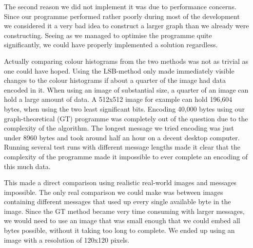 The second reason we did not implement it was due to performance concerns.
Since our programme performed rather poorly during most of the development we considered it a very bad idea to construct a larger graph than we already were constructing.
Seeing as we managed to optimise the programme quite significantly, we could have properly implemented a solution regardless.

Actually comparing colour histograms from the two methods was not as trivial as one could have hoped.
Using the LSB-method only made immediately visible changes to the colour histograms if about a quarter of the image had data encoded in it.
When using an image of substantial size, a quarter of an image can hold a large amount of data. 
A 512x512 image for example can hold 196,604 bytes, when using the two least significant bits.
Encoding 40,000 bytes using our graph-theoretical (GT) programme was completely out of the question due to the complexity of the algorithm.
The longest message we tried encoding was just under 8960 bytes and took around half an hour on a decent desktop computer.
Running several test runs with different message lengths made it clear that the complexity of the programme made it impossible to ever complete an encoding of this much data.

This made a direct comparison using realistic real-world images and messages impossible. 
The only real comparison we could make was between images containing different messages that used up every single available byte in the image.
Since the GT method became very time consuming with larger messages, we would need to use an image that was small enough that we could embed all bytes possible, without it taking too long to complete.
We ended up using an image with a resolution of 120x120 pixels.

